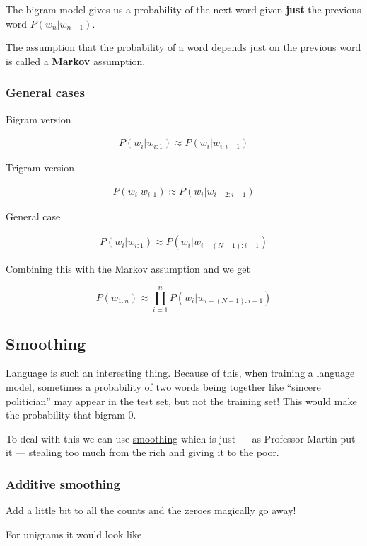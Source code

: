 \documentclass[11pt]{article}
\begin{document}
The bigram model gives us a probability of the next word given \textbf{just} the
previous word $P(w_n|w_{n-1})$.

The assumption that the probability of a word depends just on the previous word
is called a \textbf{Markov} assumption.

\subsubsection*{General cases}

Bigram version

\begin{align*}
	P(w_i|w_{i:1}) \approx P(w_i | w_{i:i-1})
\end{align*}

Trigram version

\begin{align*}
	P(w_i|w_{i:1}) \approx P(w_i | w_{i-2:i-1})
\end{align*}

General case

\begin{align*}
	P(w_i|w_{i:1}) \approx P(w_i | w_{i-(N-1):i-1})
\end{align*}

Combining this with the Markov assumption and we get

\[
	P(w_{1:n}) \approx \prod_{i=1}^n P(w_i|w_{i-(N-1):i-1})
\]


\subsection{Smoothing}

Language is such an interesting thing. Because of this, when training a language
model, sometimes a probability of two words being together like ``sincere
politician'' may appear in the test set, but not the training set! This would
make the probability that bigram 0.

To deal with this we can use \underline{smoothing} which is just --- as
Professor Martin put it --- stealing too much from the rich and giving it to the
poor.

\subsubsection{Additive smoothing}

Add a little bit to all the counts and the zeroes magically go away!

For unigrams it would look like
\end{document}
